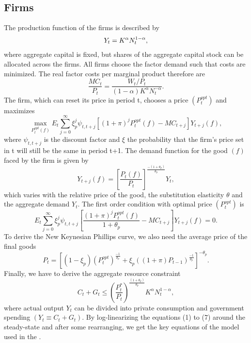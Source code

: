 \subsection*{Firms}
The production function of the firms is described by
\begin{equation}
Y_t = K^\alpha N_t^{1-\alpha},\vspace{-0.3cm} \nonumber
\end{equation}
where aggregate capital is fixed, but shares of the aggregate capital stock can be allocated across the firms. All firms choose the factor demand such that costs are minimized. The real factor costs per marginal product therefore are
\begin{equation}
\frac{MC_t}{P_t} = \frac{W_t/P_t}{\left(1 - \alpha \right) K^\alpha N_t^{-\alpha}}.
\end{equation}
The firm, which can reset its price in period t, chooses a price $\left(P_t^{opt} \right)$ and maximizes
\begin{equation}
\max_{P_t^{opt}\left(f\right)} E_t \sum_{j=0}^\infty \xi_p^j \psi_{t,t+j} \left[ \left(1 + \pi \right)^j P_t^{opt}\left(f\right) - MC_{t+j} \right] Y_{t+j} \left(f\right),\nonumber
\end{equation}
where $\psi_{t,t+j}$ is the discount factor and $\xi$ the probability that the firm's price set in t will still be the same in period t+1. The demand function for the good $\left(f\right)$ faced by the firm is given by
\begin{equation}
Y_{t+j}\left(f\right) = \left[\frac{P_t \left(f\right)}{P_t} \right]^{\frac{-\left(1+\theta_p\right)}{\theta_p}} Y_t \nonumber,
\end{equation}
which varies with the relative price of the good, the substitution elasticity $\theta$ and the aggregate demand $Y_t$. The first order condition with optimal price $\left(P_t^{opt} \right)$ is
\begin{equation}
E_t \sum_{j=0}^\infty \xi_p^j \psi_{t,t+j} \left[ \frac{\left(1 + \pi \right)^j P_t^{opt}\left(f\right)}{1 + \theta_p} - MC_{t+j} \right] Y_{t+j}\left(f\right) = 0.
\end{equation}
To derive the New Keynesian Phillips curve, we also need the average price of the final goods
\begin{equation}
P_t = \left[\left(1 - \xi_p\right)\left(P_t^{opt}\right)^{\frac{-1}{\theta_p}} + \xi_p \left(\left(1 + \pi\right)P_{t-1}\right)^{\frac{-1}{\theta_p}} \right]^{-\theta_p}.
\end{equation}
Finally, we have to derive the aggregate resource constraint
\begin{equation}
C_t + G_t \leq \left(\frac{P_t^*}{P_t}\right)^{\frac{\left(1+\theta_p\right)}{\theta_p}} K^\alpha N_t^{1-\alpha},
\end{equation}
where actual output $Y_t$ can be divided into private consumption and government spending $\left(Y_t \equiv C_t + G_t \right)$.\newline
By log-linearizing the equations (1) to (7) around the steady-state and after some rearranging, we get the key equations of the model used in the \citet{Erceg.2014}.

